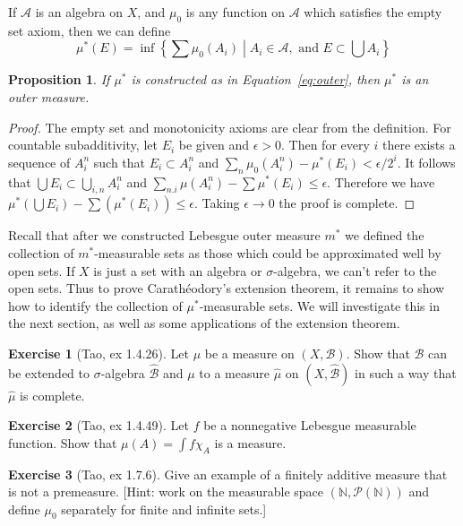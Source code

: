 \documentclass[11pt,oneside]{amsbook}
\newcommand{\NN}{{\mathbb N}}
\theoremstyle{definition}
\newtheorem{exerc}{Exercise}[section]
\theoremstyle{plain}
\newtheorem{prop}[thm]{Proposition}
\theoremstyle{definition}
\theoremstyle{remark}
\numberwithin{equation}{section}
\numberwithin{figure}{section}
\begin{document}
If $\mathcal A$ is an algebra on $X$, and $\mu_0$ is any function on $\mathcal A$ which satisfies the empty set axiom, then we can define
\begin{equation}
  \label{eq:outer}
  \mu^*(E)=\inf\left\{\left.\sum\mu_0(A_i)\;\right|\;A_i\in\mathcal A,\text{ and }E\subset\bigcup A_i\right\}
\end{equation}

\begin{prop}
  If $\mu^*$ is constructed as in Equation~\eqref{eq:outer}, then $\mu^*$ is an outer measure.
\end{prop}

\begin{proof}
  The empty set and monotonicity axioms are clear from the definition. For countable subadditivity, let $E_i$ be given and $\epsilon>0$. Then for every $i$ there exists a sequence of $A_i^n$ such that $E_i\subset A_i^n$ and $\sum_n\mu_0(A_i^n)-\mu^*(E_i)<\epsilon/2^i$. It follows that $\bigcup E_i\subset\bigcup_{i,n} A_i^n$ and $\sum_{n.i}\mu(A_i^n)-\sum\mu^*(E_i)\leq\epsilon$. Therefore we have $\mu^*(\bigcup E_i)-\sum(\mu^*(E_i))\leq\epsilon$. Taking $\epsilon\to0$ the proof is complete.
\end{proof}

Recall that after we constructed Lebesgue outer measure $m^*$ we defined the collection of $m^*$-measurable sets as those which could be approximated well by open sets. If $X$ is just a set with an algebra or $\sigma$-algebra, we can't refer to the open sets. Thus to prove Carath\'eodory's extension theorem, it remains to show how to identify the collection of $\mu^*$-measurable sets. We will investigate this in the next section, as well as some applications of the extension theorem.

\begin{exerc}[Tao, ex 1.4.26]
  Let $\mu$ be a measure on $(X,\mathcal B)$. Show that $\mathcal B$ can be extended to $\sigma$-algebra $\hat{\mathcal B}$ and $\mu$ to a measure $\hat\mu$ on $(X,\hat{\mathcal B})$ in such a way that $\hat\mu$ is complete.
\end{exerc}

\begin{exerc}[Tao, ex 1.4.49]
  Let $f$ be a nonnegative Lebesgue measurable function. Show that $\mu(A)=\int f\chi_A$ is a measure.
\end{exerc}


\begin{exerc}[Tao, ex 1.7.6]
  Give an example of a finitely additive measure that is not a premeasure. [Hint: work on the measurable space $(\NN,\mathcal P(\NN))$ and define $\mu_0$ separately for finite and infinite sets.]
\end{exerc}
\end{document}
